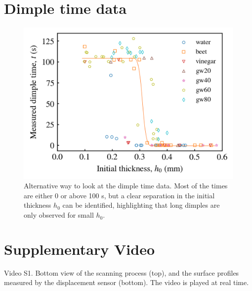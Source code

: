 \documentclass[aps,pre,onecolumn,superscriptaddress,notitlepage,10pt]{revtex4-2}
\begin{document}
\newpage

\section{Dimple time data}

\begin{figure}[ht]
    \centering
    \includegraphics[width=\linewidth]{Figures/all_dimple_time_data.png}
    \caption{
    Alternative way to look at the dimple time data. Most of the times are either 0 or above 100 s, but a clear separation in the initial thickness $h_0$ can be identified, highlighting that long dimples are only observed for small $h_0$.
    }
    \label{fig:all-dimple-time-data}
\end{figure}


\newpage
\section{Supplementary Video}

Video S1. Bottom view of the scanning process (top), and the surface profiles measured by the displacement sensor (bottom). The video is played at real time. 
\end{document}
